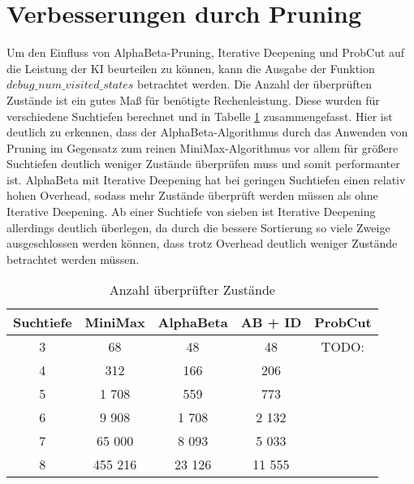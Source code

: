\section{Verbesserungen durch Pruning}

Um den Einfluss von AlphaBeta-Pruning, Iterative Deepening und ProbCut auf die Leistung der KI beurteilen zu können,
kann die Ausgabe der Funktion $debug\_num\_visited\_states$ betrachtet werden. Die Anzahl der überprüften Zustände ist
ein gutes Maß für benötigte Rechenleistung. Diese wurden für verschiedene Suchtiefen berechnet und in Tabelle
\ref{table:numstates} zusammengefasst. Hier ist deutlich zu erkennen, dass der AlphaBeta-Algorithmus durch das Anwenden
von Pruning im Gegensatz zum reinen MiniMax-Algorithmus vor allem für größere Suchtiefen deutlich weniger Zustände
überprüfen muss und somit performanter ist. AlphaBeta mit Iterative Deepening hat bei geringen Suchtiefen einen relativ
hohen Overhead, sodass mehr Zustände überprüft werden müssen als ohne Iterative Deepening. Ab einer Suchtiefe von sieben
ist Iterative Deepening allerdings deutlich überlegen, da durch die bessere Sortierung so viele Zweige ausgeschlossen
werden können, dass trotz Overhead deutlich weniger Zustände betrachtet werden müssen.

\begin{table}[hb]
\centering
\begin{tabular}{c|cccc}
\hline
Suchtiefe & MiniMax & AlphaBeta & AB + ID & ProbCut \\ \hline
    3     &   68    &    48     &    48   & TODO: \\
    4     &   312   &    166    &    206  & \\
    5     &  1 708  &    559    &    773  & \\
    6     &  9 908  &   1 708   &   2 132 & \\ 
    7     &  65 000 &   8 093   &   5 033 & \\ 
    8     & 455 216 &   23 126  &  11 555 & \\ \hline
\end{tabular}
\caption{Anzahl überprüfter Zustände}
\label{table:numstates}
\end{table}
